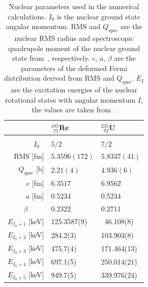 \begin{table}[b]
\caption{\label{tab:params}%
Nuclear parameters used in the numerical calculations. $I_0$ is the nuclear ground state angular momentum. RMS and $Q_\text{spec}$ are the nuclear RMS radius and spectroscopic quadrupole moment of the nuclear ground state from~\cite{Angeli2013,Stone2005}, respectively. $c$, $a$, $\beta$ are the parameters of the deformed Fermi distribution derived from RMS and $Q_\text{spec}$. $E_{I}$ are the excitation energies of the nuclear rotational states with angular momentum $I$, the values are taken from~\cite{ENSDF}.}
\centering
\begin{tabular}{r|ll}
& $^{185}_{\phantom{1}75}$Re & $^{235}_{\phantom{1}92}$U\\ \hline \\[-10pt]
$I_0$ \hfill$\phantom{.}$ & $5/2$ & $7/2$ \\
RMS \hfill[fm] & $5.3596(172)$ & $5.8337(41)$ \\
$Q_\text{spec}$ \hfill[b] & $2.21(4)\phantom{111}$ & $4.936(6)\phantom{1}$ \\
$c$ \hfill[fm] & $6.3517$ & $6.9562$ \\
$a$ \hfill[fm] & 0.5234 & 0.5234 \\
$\beta$ \hfill$\phantom{.abc.}$ & 0.2322 & 0.2711 \\[7pt]
$E_{I_0 + 1}$ \hfill[keV] & 125.3587(9) &  $\phantom{1}$46.108(8) \\
$E_{I_0 + 2}$ \hfill[keV] & 284.2(3) & 103.903(8) \\
$E_{I_0 + 3}$ \hfill[keV] & 475.7(4) & 171.464(13) \\
$E_{I_0 + 4}$ \hfill[keV] & 697.1(5) & 250.014(21) \\
$E_{I_0 + 5}$ \hfill[keV] & 949.7(5) & 339.976(24) \\
\end{tabular}
\end{table}
%

